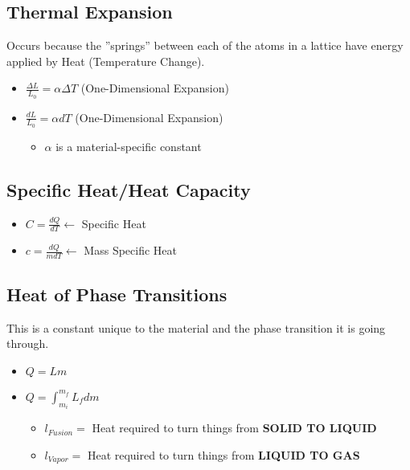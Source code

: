 \documentclass[10pt,letterpaper,final,twoside,notitlepage]{article}
\numberwithin{equation}{section} %
\begin{document}
	\subsection*{Thermal Expansion} \label{subsec:Thermal Expansion}
	Occurs because the ''springs'' between each of the atoms in a lattice have energy applied by Heat (Temperature Change).
		\begin{itemize}
			\item $\frac{\Delta L}{L_{0}} = \alpha \Delta T$ (One-Dimensional Expansion)
			\item $\frac{dL}{L_{0}} = \alpha dT$ (One-Dimensional Expansion)
			\begin{itemize}[noitemsep, nolistsep]
				\item $\alpha$ is a material-specific constant
			\end{itemize}
		\end{itemize}
	
	\subsection*{Specific Heat/Heat Capacity} \label{subsec:Specific Heat/Heat Capacity}
		\begin{itemize}
			\item $C = \frac{dQ}{dT} \leftarrow$ Specific Heat
			\item $c = \frac{dQ}{mdT} \leftarrow$ Mass Specific Heat
		\end{itemize}
	
	\subsection*{Heat of Phase Transitions} \label{subec:Heat Phase Transitions}
	This is a constant unique to the material and the phase transition it is going through.
	\begin{itemize}[nolistsep]
		\item $Q = Lm$
		\item $Q = \int_{m_{i}}^{m_{f}} L_{f} dm$
		\begin{itemize}[noitemsep, nolistsep]
			\item $l_{Fusion} = $ Heat required to turn things from \textbf{SOLID TO LIQUID}
			\item $l_{Vapor} = $ Heat required to turn things from \textbf{LIQUID TO GAS}
		\end{itemize}
	\end{itemize}
\end{document}
